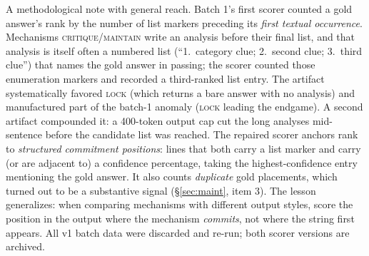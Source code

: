 \documentclass[10pt]{article}
\newcommand{\Mlock}{\textsc{lock}}
\newcommand{\Mmaint}{\textsc{maintain}}
\newcommand{\Mcrit}{\textsc{critique}}
\begin{document}
A methodological note with general reach. Batch 1's first scorer counted
a gold answer's rank by the number of list markers preceding its
\emph{first textual occurrence}. Mechanisms \Mcrit{}/\Mmaint{} write an
analysis before their final list, and that analysis is itself often a
numbered list (``1.\ category clue; 2.\ second clue; 3.\ third clue'')
that names the gold answer in passing; the scorer counted those
enumeration markers and recorded a third-ranked list entry. The artifact
systematically favored \Mlock{} (which returns a bare answer with no
analysis) and manufactured part of the batch-1 anomaly (\Mlock{}
leading the endgame). A second artifact compounded it: a 400-token
output cap cut the long analyses mid-sentence before the candidate
list was reached. The repaired scorer anchors rank to \emph{structured
commitment positions}: lines that both carry a list marker and carry
(or are adjacent to) a confidence percentage, taking the
highest-confidence entry mentioning the gold answer. It also counts
\emph{duplicate} gold placements, which turned out to be a substantive
signal (\S\ref{sec:maint}, item 3). The lesson generalizes: when
comparing mechanisms with different output styles, score the position in
the output where the mechanism \emph{commits}, not where the string first
appears. All v1 batch data were discarded and re-run; both scorer
versions are archived.
\end{document}
